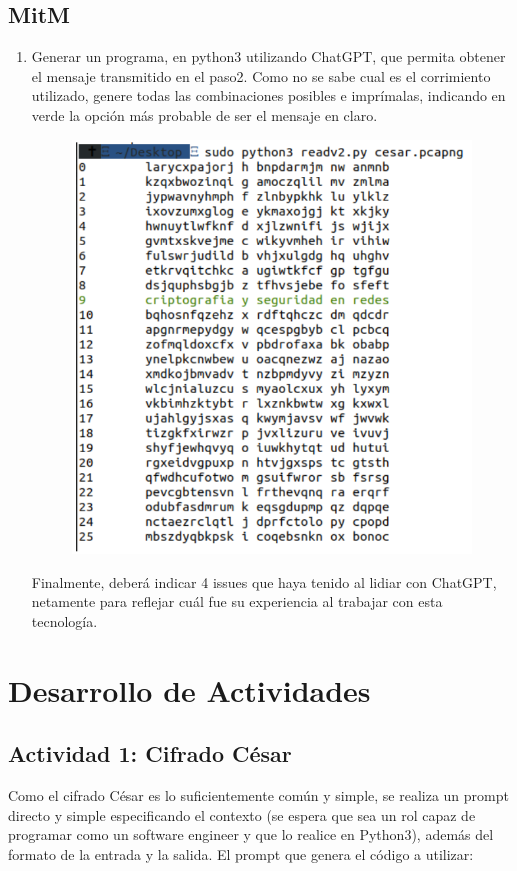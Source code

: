 \documentclass[letter,12pt]{article}
\begin{document}
\subsection{MitM}
\begin{enumerate}
    \item Generar un programa, en python3 utilizando ChatGPT, que permita
obtener el mensaje transmitido en el paso2. Como no se sabe cual es el
corrimiento utilizado, genere todas las combinaciones posibles e imprímalas,
indicando en verde la opción más probable de ser el mensaje en claro.
    \begin{figure}[H]
        \centering
        \includegraphics[width=12cm]{actividades/A3.png}
        \label{fig:a3}
    \end{figure}
    Finalmente, deberá indicar 4 issues que haya tenido al lidiar con ChatGPT,
netamente para reflejar cuál fue su experiencia al trabajar con esta tecnología.
\end{enumerate}

\section{Desarrollo de Actividades}
\subsection{Actividad 1: Cifrado César}
Como el cifrado César es lo suficientemente común y simple, se realiza un prompt
directo y simple especificando el contexto (se espera que sea un rol capaz de
programar como un software engineer y que lo realice en Python3), además del
formato de la entrada y la salida. El prompt que genera el código a utilizar:
\end{document}
